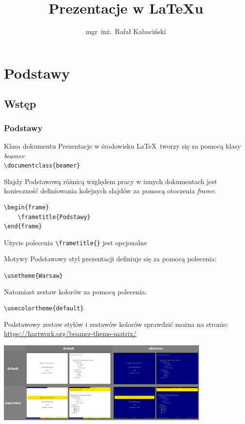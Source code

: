 \documentclass{beamer}
\author{mgr~inż.~Rafał Kabaciński}
\title{Prezentacje w \LaTeX u}
\begin{document}
\begin{frame}
\titlepage
\end{frame}

\begin{frame}
	\tableofcontents
\end{frame}

\section{Podstawy}

\subsection{Wstęp}
	\begin{frame}[containsverbatim]
		\frametitle{Podstawy}
		
		\begin{block}{Klasa dokumentu}
			Prezentacje w środowisku \LaTeX\ tworzy się za pomocą klasy \emph{beamer}\\
			\verb|\documentclass{beamer}|
		\end{block}

		\begin{block}{Slajdy}
			Podstawową różnicą względem pracy w innych dokumentach jest konieczność definiowania kolejnych slajdów za pomocą otoczenia \emph{frame}:
			
			\begin{lstlisting}
\begin{frame}
	\frametitle{Podstawy}
\end{frame}
			\end{lstlisting}
			Użycie polecenia \verb|\frametitle{}| jest opcjonalne
		\end{block}
		
	\end{frame}

	\begin{frame}[containsverbatim]{Motywy}
		Podstawowy styl prezentacji definiuje się za pomocą polecenia:
		\begin{center}
			\verb|\usetheme{Warsaw}|
		\end{center}
		Natomiast zestaw kolorów za pomocą polecenia:
		\begin{center}
			\verb|\usecolortheme{default}|
		\end{center}
		Podstawowy zestaw stylów i zestawów kolorów sprawdzić można na stronie: \url{https://hartwork.org/beamer-theme-matrix/}
		\begin{center}
		\includegraphics[width=0.8\textwidth]{Ilustracje/Thems}
		\end{center}

	\end{frame}
	
\end{document}
